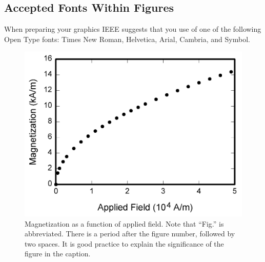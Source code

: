 \documentclass[journal]{IEEEtran}
\begin{document}
\subsection{Accepted Fonts Within Figures}
When preparing your graphics IEEE suggests that you use of one of the following Open Type fonts: Times New Roman, Helvetica, Arial, Cambria, and Symbol.

\begin{figure}[t]
	\centering
	\includegraphics[width=\linewidth]{./fig1.png}
	\caption{Magnetization as a function of applied field. Note that “Fig.” is abbreviated. There is a period after the figure number, followed by two spaces. It is good practice to explain the significance of the figure in the caption.}
	\label{fig:examplesinglefig}
\end{figure}
\end{document}
